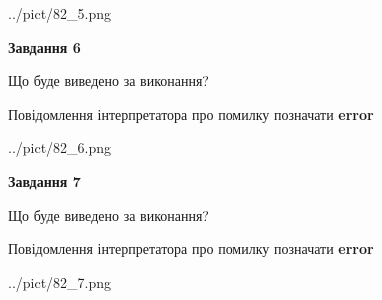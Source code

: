 \documentclass[10pt, ukrainian]{article}
\begin{document}
{\begin {large}
\begin{center}
	{../pict/82_5.png}
\end{center}
\newpage

{\begin {center}\textbf{Завдання 6}\end {center}}\par
Що буде виведено за виконання? \par
Повідомлення інтерпретатора про помилку позначати \textbf{error}

\begin{center}
	{../pict/82_6.png}
\end{center}
\newpage

{\begin {center}\textbf{Завдання 7}\end {center}}\par
Що буде виведено за виконання? \par
Повідомлення інтерпретатора про помилку позначати \textbf{error}

\begin{center}
	{../pict/82_7.png}
\end{center}
\newpage

\end {large}}
\end{document}
